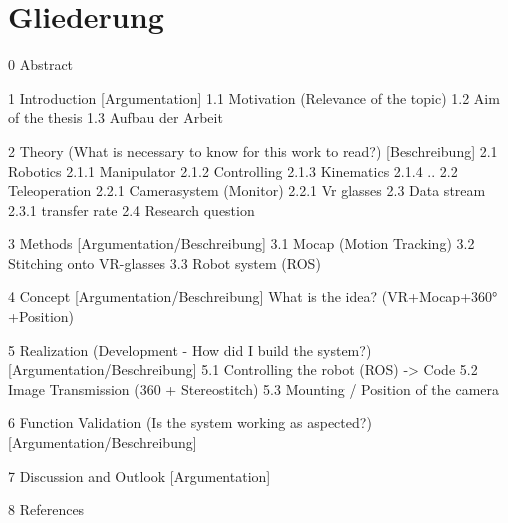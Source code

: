 \section{Gliederung}
0 Abstract

1 Introduction [Argumentation]
  1.1 Motivation (Relevance of the topic)
  1.2 Aim of the thesis
  1.3 Aufbau der Arbeit

2 Theory (What is necessary to know for this work to read?) [Beschreibung]
  2.1 Robotics
    2.1.1 Manipulator
    2.1.2 Controlling
    2.1.3 Kinematics
    2.1.4 ..
  2.2 Teleoperation
    2.2.1 Camerasystem (Monitor)
    2.2.1 Vr glasses
  2.3 Data stream
    2.3.1 transfer rate
  2.4 Research question

3 Methods [Argumentation/Beschreibung]
  3.1 Mocap (Motion Tracking)
  3.2 Stitching onto VR-glasses
  3.3 Robot system (ROS)

4 Concept [Argumentation/Beschreibung]
  What is the idea? (VR+Mocap+360°+Position)

5 Realization (Development - How did I build the system?) [Argumentation/Beschreibung]
  5.1 Controlling the robot (ROS) -> Code
  5.2 Image Transmission (360 + Stereostitch)
  5.3 Mounting / Position of the camera

6 Function Validation (Is the system working as aspected?) [Argumentation/Beschreibung]

7 Discussion and Outlook [Argumentation]

8 References
